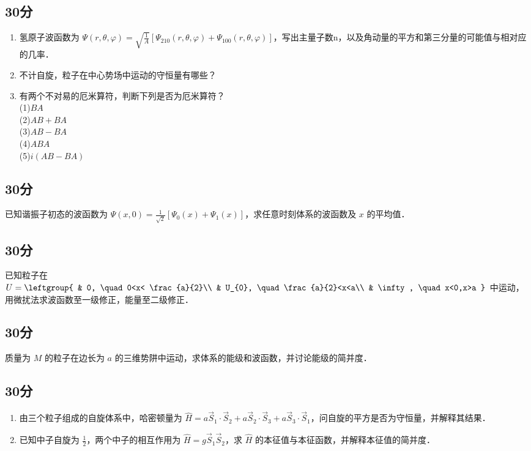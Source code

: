 
\subsection{30分}
\begin{enumerate}
\item 氢原子波函数为 $\varPsi (r,\theta,\varphi)=\sqrt{\frac{1}{A}}[\varPsi_{210}(r,\theta,\varphi)+\varPsi_{100}(r,\theta,\varphi)]$，写出主量子数n，以及角动量的平方和第三分量的可能值与相对应的几率．
\item 不计自旋，粒子在中心势场中运动的守恒量有哪些？
\item 有两个不对易的厄米算符，判断下列是否为厄米算符？\\
(1)$BA$\\(2)$AB+BA$\\(3)$AB-BA$\\(4)$ABA$\\(5)$i(AB-BA)$
\end{enumerate}
\subsection{30分}
已知谐振子初态的波函数为 $\varPsi(x,0)=\frac{1}{\sqrt{2}}[\varPsi_{0}(x)+\varPsi_{1}(x)]$，求任意时刻体系的波函数及 $x$ 的平均值．
\subsection{30分}
已知粒子在 $U=\leftgroup{
    & 0, \quad 0<x< \frac{a}{2}\\
    & U_{0}, \quad \frac{a}{2}<x<a\\
    & \infty, \quad x<0,x>a
}$ 中运动，用微扰法求波函数至一级修正，能量至二级修正．
\subsection{30分}
质量为 $M$ 的粒子在边长为 $a$ 的三维势阱中运动，求体系的能级和波函数，并讨论能级的简并度．
\subsection{30分}
\begin{enumerate}
\item 由三个粒子组成的自旋体系中，哈密顿量为 $\hat {H}=a\vec{S}_1\cdot\vec{S}_2+a\vec{S}_2\cdot\vec{S}_3+a\vec{S}_3\cdot\vec{S}_1$，问自旋的平方是否为守恒量，并解释其结果．
\item 已知中子自旋为 $\frac{1}{2}$，两个中子的相互作用为 $\hat {H}=g\vec{S}_1\vec{S}_2$，求 $\hat {H}$ 的本征值与本征函数，并解释本征值的简并度．
\end{enumerate}